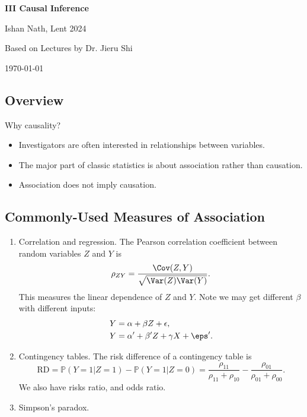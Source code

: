 \documentclass[12pt]{article}
\begin{document}
\hypersetup{pageanchor=false}
\begin{titlepage}
	\begin{center}
		\vspace*{1em}
		\Huge
		\textbf{III Causal Inference}

		\vspace{1em}
		\large
		Ishan Nath, Lent 2024

		\vspace{1.5em}

		\Large

		Based on Lectures by Dr. Jieru Shi

		\vspace{1em}

		\large
		\today
	\end{center}
	
\end{titlepage}
\hypersetup{pageanchor=true}

\tableofcontents

\newpage


\setcounter{section}{-1}

\subsection{Overview}%
\label{sub:o}

Why causality?
\begin{itemize}
	\item Investigators are often interested in relationships between variables.
	\item The major part of classic statistics is about association rather than causation.
	\item Association does not imply causation.
\end{itemize}

\subsection{Commonly-Used Measures of Association}%
\label{sub:com_m}

\begin{enumerate}
	\item Correlation and regression. The Pearson correlation coefficient between random variables $Z$ and $Y$ is
		\[
			\rho_{ZY} = \frac{\Cov(Z,Y)}{\sqrt{\Var(Z)\Var(Y)}}.
		\]
		This measures the linear dependence of $Z$ and $Y$. Note we may get different $\beta$ with different inputs:
		\begin{align*}
			Y &= \alpha + \beta Z + \epsilon, \\
			Y &= \alpha' + \beta' Z + \gamma X + \eps'.
		\end{align*}
	\item Contingency tables. The risk difference of a contingency table is
		\[
		\mathrm{RD} = \mathbb{P}(Y = 1|Z=1) - \mathbb{P}(Y = 1|Z = 0) = \frac{\rho_{11}}{\rho_{11} + \rho_{10}} - \frac{\rho_{01}}{\rho_{01} + \rho_{00}}.
		\]
		We also have risks ratio, and odds ratio.
	\item Simpson's paradox.
\end{enumerate}
\end{document}
